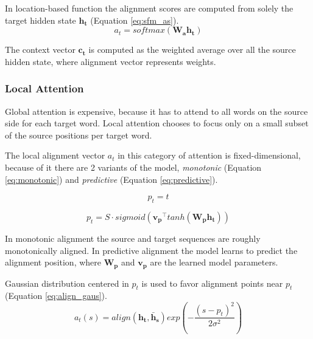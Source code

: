 In location-based function the alignment scores are computed from solely the target hidden state $\mathbf{h_t}$ (Equation \ref{eq:sfm_as}).
\begin{equation} \label{eq:sfm_as}
a_t = softmax(\mathbf{W_a}\mathbf{h_t})
\end{equation}

The context vector $\mathbf{c_t}$ is computed as the weighted average over all the source hidden state, where alignment vector represents weights.

\subsubsection{Local Attention}
Global attention is expensive, because it has to attend to all words on the source side for each target word. Local attention chooses to focus only on a small subset of the source positions per target word.

The local alignment vector $a_t$ in this category of attention is fixed-dimensional, because of it there are 2 variants of the model, \textit{monotonic} (Equation \ref{eq:monotonic}) and \textit{predictive} (Equation \ref{eq:predictive}).

\begin{equation} \label{eq:monotonic}
p_t = t
\end{equation}

\begin{equation} \label{eq:predictive}
p_t = S \cdot sigmoid(\mathbf{v_p}^\intercal tanh(\mathbf{W_p} \mathbf{h_t}))
\end{equation}

In monotonic alignment the source and target sequences are roughly monotonically aligned. In predictive alignment the model learns to predict the alignment position, where $\mathbf{W_p}$ and $\mathbf{v_p}$ are the learned model parameters.

Gaussian distribution centered in $p_t$ is used to favor alignment points near $p_t$ (Equation \ref{eq:align_gaus}).
\begin{equation} \label{eq:align_gaus}
a_t(s) = align(\mathbf{h_t}, \mathbf{\bar{h}_s}) exp(-\frac{(s-p_t)^2}{2\sigma^2})
\end{equation}

